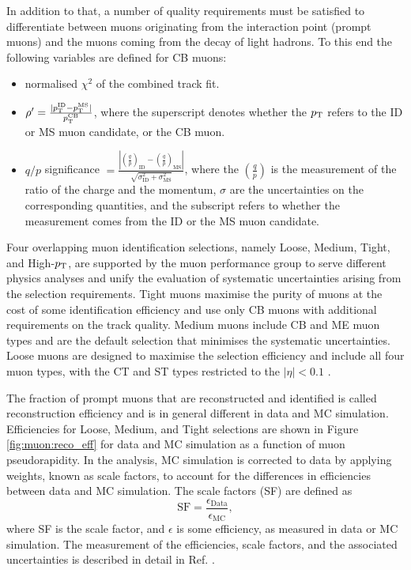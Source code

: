 In addition to that, a number of quality requirements must be
satisfied to differentiate between muons originating from the
interaction point (prompt muons) and the muons coming from the
decay of light hadrons. To this end the following variables are
defined for CB muons:
\begin{itemize}
\item normalised $\chi^2$ of the combined track fit.
\item $\rho' = \frac{|p_{\text{T}}^{\text{ID}} - p_{\text{T}}^{\text{MS}}|}{p_{\text{T}}^{\text{CB}}}$,
where the superscript denotes whether the $p_{\text{T}}$ refers to the
ID or MS muon candidate, or the CB muon.
\item $q/p$ significance $ = \frac{\left|\left(\frac{q}{p}\right)_\text{ID}
- \left(\frac{q}{p}\right)_\text{MS}\right|}
{\sqrt{\sigma^2_\text{ID} + \sigma^2_\text{MS}}}$,
where the $\left(\frac{q}{p}\right)$ is the measurement of the ratio of
the charge and the momentum, $\sigma$ are the uncertainties on
the corresponding quantities, and the subscript refers to whether
the measurement comes from the ID or the MS muon candidate.
\end{itemize}

Four overlapping muon identification selections, namely Loose, Medium, Tight,
and High-$p_{\text{T}}$, are supported by the muon performance group to 
serve different physics analyses and unify the evaluation of
systematic uncertainties arising from the selection requirements.
Tight muons maximise the purity of muons at the cost of some
identification efficiency and use only CB muons with additional
requirements on the track quality. Medium muons include CB and ME
muon types and are the default selection that minimises the systematic
uncertainties. Loose muons are designed to maximise the selection
efficiency and include all four muon types, with the CT and ST types
restricted to the $|\eta| < 0.1$ \cite{Aad:2016jkr}.

The fraction of prompt muons that are reconstructed and identified
is called reconstruction efficiency and is in general different
in data and MC simulation. Efficiencies for Loose, Medium, and Tight
selections are shown in Figure \ref{fig:muon:reco_eff} for data and
MC simulation as a function of muon pseudorapidity. In the analysis,
MC simulation is corrected to data by applying weights, known as
scale factors, to account for the differences in efficiencies between
data and MC simulation. The scale factors (SF) are defined as
\begin{equation}
\text{SF} = \frac{\epsilon_\text{Data}}{\epsilon_\text{MC}},
\end{equation}
where SF is the scale factor, and $\epsilon$ is some efficiency,
as measured in data or MC simulation. The measurement of the
efficiencies, scale factors, and the associated
uncertainties is described in detail in Ref. \cite{Aad:2016jkr}.

